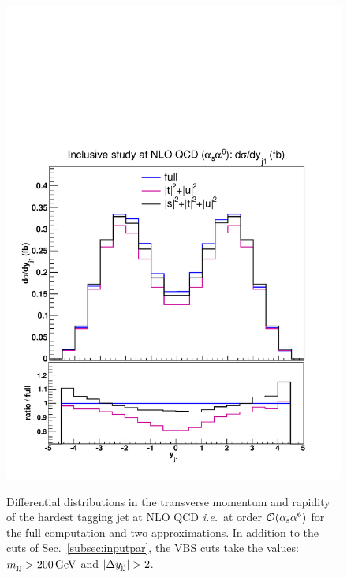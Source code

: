\begin{figure}[hbt]
{\includegraphics[scale=0.35]{figures/scanfigures/yj1_nlo.pdf}}
\caption{Differential distributions in the transverse momentum and rapidity of the hardest tagging jet at NLO QCD \emph{i.e.}\ at order $\mathcal{O}(\alpha_\text{s}\alpha^6)$ for the full computation and two approximations.
In addition to the cuts of Sec.~\ref{subsec:inputpar}, the VBS cuts take the values: $m_{\text{j}\text{j}}>200 \,\text{GeV}$ and $|\Delta y_{\Pj\Pj}|>2$.} 
\label{fig:mjjdyjj_1d_2}
\end{figure}

